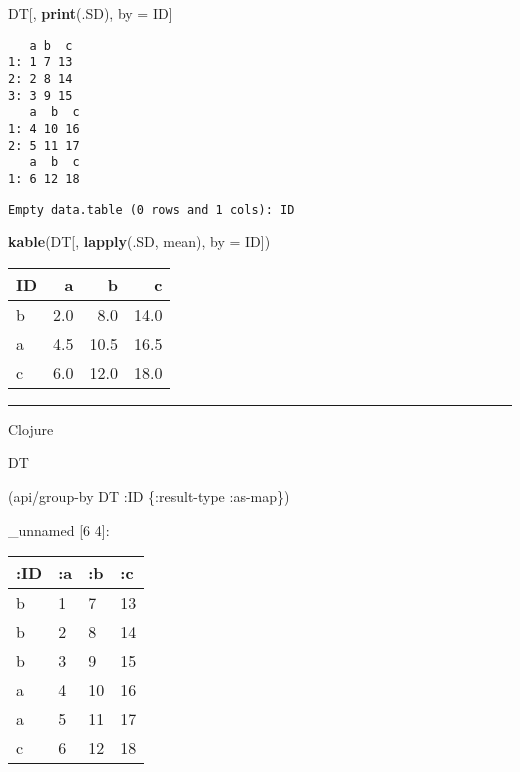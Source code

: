 \documentclass[]{article}
\newenvironment{Shaded}{\begin{snugshade}}{\end{snugshade}}
\newcommand{\AttributeTok}[1]{\textcolor[rgb]{0.77,0.63,0.00}{#1}}
\newcommand{\DataTypeTok}[1]{\textcolor[rgb]{0.13,0.29,0.53}{#1}}
\newcommand{\KeywordTok}[1]{\textcolor[rgb]{0.13,0.29,0.53}{\textbf{#1}}}
\newcommand{\NormalTok}[1]{#1}
\newcommand{\StringTok}[1]{\textcolor[rgb]{0.31,0.60,0.02}{#1}}
\begin{document}
\begin{Shaded}
\begin{Highlighting}[]
\NormalTok{DT[, }\KeywordTok{print}\NormalTok{(.SD), by =}\StringTok{ }\NormalTok{ID]}
\end{Highlighting}
\end{Shaded}

\begin{verbatim}
   a b  c
1: 1 7 13
2: 2 8 14
3: 3 9 15
   a  b  c
1: 4 10 16
2: 5 11 17
   a  b  c
1: 6 12 18
\end{verbatim}

\begin{verbatim}
Empty data.table (0 rows and 1 cols): ID
\end{verbatim}

\begin{Shaded}
\begin{Highlighting}[]
\KeywordTok{kable}\NormalTok{(DT[, }\KeywordTok{lapply}\NormalTok{(.SD, mean), }\DataTypeTok{by =}\NormalTok{ ID])}
\end{Highlighting}
\end{Shaded}

\begin{longtable}[]{@{}lrrr@{}}
\toprule
ID & a & b & c\tabularnewline
\midrule
\endhead
b & 2.0 & 8.0 & 14.0\tabularnewline
a & 4.5 & 10.5 & 16.5\tabularnewline
c & 6.0 & 12.0 & 18.0\tabularnewline
\bottomrule
\end{longtable}

\begin{center}\rule{0.5\linewidth}{0.5pt}\end{center}

Clojure

\begin{Shaded}
\begin{Highlighting}[]
\NormalTok{DT}

\NormalTok{(api/group-by DT }\AttributeTok{:ID}\NormalTok{ \{}\AttributeTok{:result-type} \AttributeTok{:as-map}\NormalTok{\})}
\end{Highlighting}
\end{Shaded}

\_unnamed {[}6 4{]}:

\begin{longtable}[]{@{}llll@{}}
\toprule
:ID & :a & :b & :c\tabularnewline
\midrule
\endhead
b & 1 & 7 & 13\tabularnewline
b & 2 & 8 & 14\tabularnewline
b & 3 & 9 & 15\tabularnewline
a & 4 & 10 & 16\tabularnewline
a & 5 & 11 & 17\tabularnewline
c & 6 & 12 & 18\tabularnewline
\bottomrule
\end{longtable}
\end{document}
